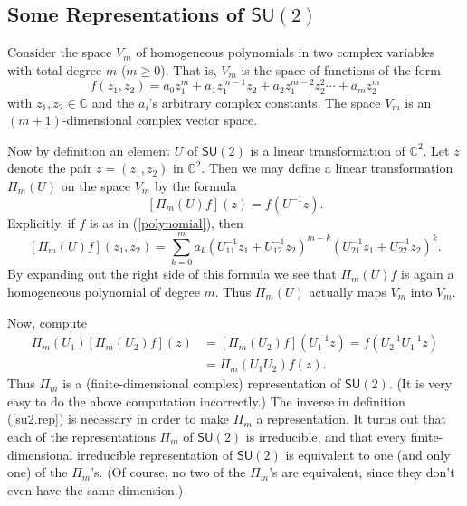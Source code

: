\documentclass[12pt]{amsbook}
\theoremstyle{plain}
\numberwithin{equation}{chapter}
\numberwithin{theorem}{chapter}
\begin{document}
\subsection{Some Representations of $\mathsf{SU}(2)$}

Consider the space $V_{m}$ of homogeneous polynomials in two complex variables
with total degree $m$ ($m\geq0$). That is, $V_{m}$ is the space of functions
of the form
\begin{equation}
f(z_{1},z_{2})=a_{0}z_{1}^{m}+a_{1}z_{1}^{m-1}z_{2}+a_{2}z_{1}^{m-2}z_{2}%
^{2}\cdots+a_{m}z_{2}^{m}\label{polynomial}%
\end{equation}
with $z_{1},z_{2}\in\mathbb{C}$ and the $a_{i}$'s arbitrary complex constants.
The space $V_{m}$ is an $(m+1)$-dimensional complex vector space.

Now by definition an element $U$ of $\mathsf{SU}(2)$ is a linear
transformation of $\mathbb{C}^{2}$. Let $z$ denote the pair $z=(z_{1},z_{2})$
in $\mathbb{C}^{2}$. Then we may define a linear transformation $\Pi_{m}(U)$
on the space $V_{m}$ by the formula
\begin{equation}
\left[  \Pi_{m}(U)f\right]  (z)=f(U^{-1}z)\text{.}\label{su2.rep}%
\end{equation}
Explicitly, if $f$ is as in (\ref{polynomial}), then
\[
\left[  \Pi_{m}(U)f\right]  (z_{1},z_{2})=\sum_{k=0}^{m}a_{k}\left(
U_{11}^{-1}z_{1}+U_{12}^{-1}z_{2}\right)  ^{m-k}\left(  U_{21}^{-1}%
z_{1}+U_{22}^{-1}z_{2}\right)  ^{k}\text{.}%
\]
By expanding out the right side of this formula we see that $\Pi_{m}(U)f$ is
again a homogeneous polynomial of degree $m$. Thus $\Pi_{m}(U)$ actually maps
$V_{m}$ into $V_{m}$.

Now, compute
\begin{align*}
\Pi_{m}\left(  U_{1}\right)  \left[  \Pi_{m}\left(  U_{2}\right)  f\right]
(z)  & =\left[  \Pi_{m}\left(  U_{2}\right)  f\right]  (U_{1}^{-1}z)=f\left(
U_{2}^{-1}U_{1}^{-1}z\right) \\
& =\Pi_{m}\left(  U_{1}U_{2}\right)  f(z)\text{.}%
\end{align*}
Thus $\Pi_{m}$ is a (finite-dimensional complex) representation of
$\mathsf{SU}(2)$. (It is very easy to do the above computation incorrectly.)
The inverse in definition (\ref{su2.rep}) is necessary in order to make
$\Pi_{m}$ a representation. It turns out that each of the representations
$\Pi_{m}$ of $\mathsf{SU}(2)$ is irreducible, and that every
finite-dimensional irreducible representation of $\mathsf{SU}(2)$ is
equivalent to one (and only one) of the $\Pi_{m}$'s. (Of course, no two of the
$\Pi_{m}$'s are equivalent, since they don't even have the same dimension.)
\end{document}
